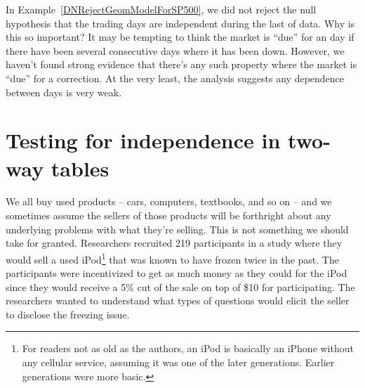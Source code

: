\begin{examplewrap}
\begin{nexample}{In
    Example~\ref{DNRejectGeomModelForSP500},
    we did not reject the null hypothesis that the trading days
    are independent during the last \spyears{} of data.
    Why is this so important?}
  It may be tempting to think the market is ``due'' for
  an  day if there have been several consecutive
  days where it has been down.
  However, we haven't found strong evidence that there's
  any such property where the market is ``due'' for
  a correction.
  At the very least, the analysis suggests any dependence
  between days is very weak.
\end{nexample}
\end{examplewrap}




{}





\section{Testing for independence in two-way tables}
\label{twoWayTablesAndChiSquare}


\newcommand{\iPodAA}{2}
\newcommand{\iPodAB}{23}
\newcommand{\iPodAC}{36}
\newcommand{\iPodAD}{61}
\newcommand{\iPodAFraction}{0.2785}
\newcommand{\iPodAExpected}{20.33}
\newcommand{\iPodBA}{71}
\newcommand{\iPodBB}{50}
\newcommand{\iPodBC}{37}
\newcommand{\iPodBD}{158}
\newcommand{\iPodBFraction}{0.7215}
\newcommand{\iPodBExpected}{52.67}
\newcommand{\iPodDA}{73}
\newcommand{\iPodDB}{73}
\newcommand{\iPodDC}{73}
\newcommand{\iPodDD}{219}
\newcommand{\iPodN}{\iPodDD}

We all buy used products --
cars, computers, textbooks, and so on --
and we sometimes assume the sellers of those products
will be forthright about any underlying problems with
what they're selling.
This is not something we should take for granted.
Researchers recruited \iPodN{} participants in a study where they
would sell a used iPod\footnote{For readers not as old as
  the authors, an iPod is basically an iPhone without
  any cellular service, assuming it was one of the later
  generations. Earlier generations were more basic.}
that was known to have frozen twice in the past.
The participants were incentivized to get as much money
as they could for the iPod since they would receive a 5\%
cut of the sale on top of \$10 for participating.
The researchers wanted to understand what types of questions
would elicit the seller to disclose the freezing issue.

